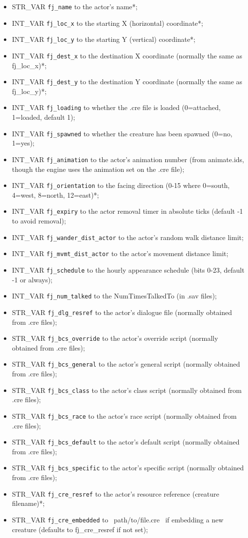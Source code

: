\documentclass{article}
\begin{document}
\begin{itemize}
\item STR_VAR \verb+fj_name+ to the actor's name*;
\item INT_VAR \verb+fj_loc_x+ to the starting X (horizontal) coordinate*;
\item INT_VAR \verb+fj_loc_y+ to the starting Y (vertical) coordinate*;
\item INT_VAR \verb+fj_dest_x+ to the destination X coordinate (normally the same as fj_loc_x)*;
\item INT_VAR \verb+fj_dest_y+ to the destination Y coordinate (normally the same as fj_loc_y)*;
\item INT_VAR \verb+fj_loading+ to whether the .cre file is loaded (0=attached, 1=loaded, default 1);
\item INT_VAR \verb+fj_spawned+ to whether the creature has been spawned (0=no, 1=yes);
\item INT_VAR \verb+fj_animation+ to the actor's animation number (from animate.ids, though the engine uses the animation set on the .cre file);
\item INT_VAR \verb+fj_orientation+ to the facing direction (0-15 where 0=south, 4=west, 8=north, 12=east)*;
\item INT_VAR \verb+fj_expiry+ to the actor removal timer in absolute ticks (default -1 to avoid removal);
\item INT_VAR \verb+fj_wander_dist_actor+ to the actor's random walk distance limit;
\item INT_VAR \verb+fj_mvmt_dist_actor+ to the actor's movement distance limit;
\item INT_VAR \verb+fj_schedule+ to the hourly appearance schedule (bits 0-23, default -1 or always);
\item INT_VAR \verb+fj_num_talked+ to the NumTimesTalkedTo (in .sav files);
\item STR_VAR \verb+fj_dlg_resref+ to the actor's dialogue file (normally obtained from .cre files);
\item STR_VAR \verb+fj_bcs_override+ to the actor's override script (normally obtained from .cre files);
\item STR_VAR \verb+fj_bcs_general+ to the actor's general script (normally obtained from .cre files);
\item STR_VAR \verb+fj_bcs_class+ to the actor's class script (normally obtained from .cre files);
\item STR_VAR \verb+fj_bcs_race+ to the actor's race script (normally obtained from .cre files);
\item STR_VAR \verb+fj_bcs_default+ to the actor's default script (normally obtained from .cre files);
\item STR_VAR \verb+fj_bcs_specific+ to the actor's specific script (normally obtained from .cre files);
\item STR_VAR \verb+fj_cre_resref+ to the actor's resource reference (creature filename)*;
\item STR_VAR \verb+fj_cre_embedded+ to ~path/to/file.cre~ if embedding a new creature (defaults to fj_cre_resref if not set);
\end{itemize}
\end{document}
